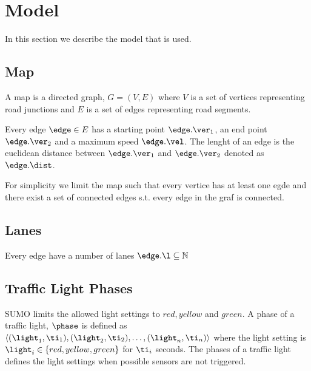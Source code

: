 \section{Model}
In this section we describe the model that is used.

\begin{comment}\\\\
\noindent\begin{tabular}{ll}
$\Sigma$ & alphabet\\
$\mathbb{R}$ & set of real numbers\\
$\mathbb{N}$ & set of natual numbers not including zero\\
$\mathbb{N}_0$ & set of natual numbers including zero
\end{tabular}
\end{comment}

\subsection{Map}
A map is a directed graph, $G = (V, E)$ where $V$ is a set of vertices representing road junctions and $E$ is a set of edges representing road segments.

Every edge $\edge\in E$ has a starting point $\edge.\ver_1$, an end point $\edge.\ver_2$ and a maximum speed $\edge.\vel$. The lenght of an edge is the euclidean distance between $\edge.\ver_1$ and $\edge.\ver_2$ denoted as $\edge.\dist$.

For simplicity we limit the map such that every vertice has at least one egde
and there exist a set of connected edges s.t. every edge in the graf is connected.%

\subsection{Lanes}
Every edge have a number of lanes $\edge.\l \subseteq \mathbb{N} $


\subsection{Traffic Light Phases}
SUMO limits the allowed light settings to $red, yellow$ and $green$.
A phase of a traffic light, $\phase$ is defined as $\langle(\light_1, \ti_1),(\light_2, \ti_2),\dots, (\light_n, \ti_n) \rangle$ where the light setting is $\light_i\in \{red, yellow, green\}$ for $\ti_i$ seconds.
The phases of a traffic light defines the light settings when possible sensors are not triggered.

